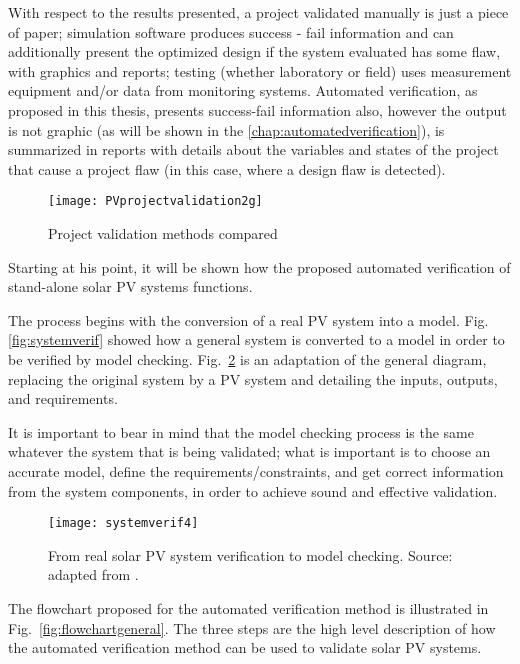 With respect to the results presented, a project validated manually is just a piece of paper; simulation software produces success - fail information and can additionally present the optimized design if the system evaluated has some flaw, with graphics and reports; testing (whether laboratory or field) uses  measurement equipment and/or data from monitoring systems. Automated verification, as proposed in this thesis, presents success-fail information also, however the output is not graphic  (as will be shown in the  \autoref{chap:automatedverification}), is summarized in reports with details about the variables and states of the project that cause a project flaw (in this case,  where a design flaw is detected).

\begin{figure}[h]
\texttt{[image: PVprojectvalidation2g]}
\centering
\caption{Project validation methods compared}
\label{fig:validation}
\end{figure}

Starting at his point, it will be shown how the proposed automated verification of stand-alone solar PV systems functions. 

The process begins with the conversion of a real PV system into a model. Fig. \ref{fig:systemverif} showed how a general system is converted to a model in order to be verified by model checking. Fig.~\ref{fig:systemverif4} is an adaptation of the general diagram, replacing the original system by a PV system and detailing the inputs, outputs, and requirements. 

It is important to bear in mind that the model checking process is the same whatever the system that is being validated; what is  important is to choose an accurate model, define the requirements/constraints, and get correct information from the system components, in order to achieve sound and effective validation.

\begin{figure}[h]
\texttt{[image: systemverif4]}
\centering
\caption{From real solar PV system verification to model checking. Source: adapted from \cite{Clarke2008}.}
\label{fig:systemverif4}
\end{figure}

The flowchart proposed for the automated verification method is illustrated in Fig.~\ref{fig:flowchartgeneral}. The three steps are the high level description of how the automated verification method can be used to validate solar PV systems.

